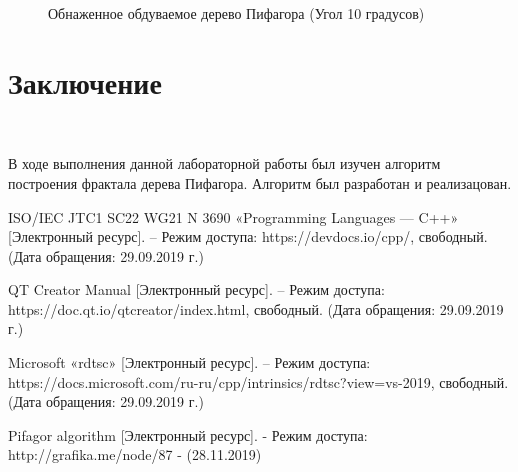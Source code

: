 \documentclass[a4paper,12pt]{article}
\begin{document}
	\begin{figure}[h!]
		\caption{
			Обнаженное обдуваемое дерево Пифагора (Угол 10 градусов)}
		\label{fig:t4}
	\end{figure}
		
		
	\section*{Заключение}
	
	~\
	
	В ходе выполнения данной лабораторной работы был изучен алгоритм построения фрактала дерева Пифагора. Алгоритм был разработан и реализацован.
	
	\newpage
	
	\begin{thebibliography}{}
		
		 ISO/IEC JTC1 SC22 WG21 N 3690 «Programming Languages — C++» [Электронный ресурс]. – Режим доступа: https://devdocs.io/cpp/, свободный. (Дата обращения: 29.09.2019 г.)
		
		 QT Creator Manual [Электронный ресурс]. – Режим
		доступа: https://doc.qt.io/qtcreator/index.html, свободный. (Дата
		обращения: 29.09.2019 г.)
		
		 Microsoft «rdtsc» [Электронный ресурс]. – Режим доступа:
		https://docs.microsoft.com/ru-ru/cpp/intrinsics/rdtsc?view=vs-2019,
		свободный. (Дата обращения: 29.09.2019 г.)
		
		Pifagor algorithm [Электронный ресурс]. - Режим доступа:
		http://grafika.me/node/87 - (28.11.2019)
		
	\end{thebibliography}
\end{document}
